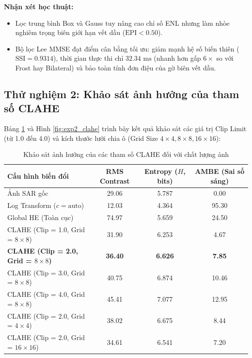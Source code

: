 \noindent \textbf{Nhận xét học thuật:}
\begin{itemize}
    \item Lọc trung bình Box và Gauss tuy nâng cao chỉ số ENL nhưng làm nhòe nghiêm trọng biên giới hạn vết dầu ($\text{EPI} < 0.50$).
    \item Bộ lọc Lee MMSE đạt điểm cân bằng tối ưu: giảm mạnh hệ số biến thiên ($\text{SSI} = 0.9314$), thời gian thực thi chỉ $32.34\text{ ms}$ (nhanh hơn gấp $6\times$ so với Frost hay Bilateral) và bảo toàn tính đơn điệu của gờ biên vết dầu.
\end{itemize}

\subsection{Thử nghiệm 2: Khảo sát ảnh hưởng của tham số CLAHE}
Bảng \ref{tab:exp2_clahe} và Hình \ref{fig:exp2_clahe} trình bày kết quả khảo sát các giá trị Clip Limit (từ 1.0 đến 4.0) và kích thước lưới chia ô (Grid Size $4 \times 4, 8 \times 8, 16 \times 16$):

\begin{table}[H]
\centering
\small
\begin{tabularx}{\textwidth}{|X|c|c|c|}
\hline
\textbf{Cấu hình biến đổi} & \textbf{RMS Contrast} & \textbf{Entropy ($H$, bits)} & \textbf{AMBE (Sai số sáng)} \\
\hline
Ảnh SAR gốc & 29.06 & 5.787 & 0.00 \\
Log Transform ($c=\text{auto}$) & 12.03 & 4.364 & 95.30 \\
Global HE (Toàn cục) & 74.97 & 5.659 & 24.50 \\
CLAHE (Clip = 1.0, Grid = $8 \times 8$) & 31.90 & 6.253 & 4.67 \\
\textbf{CLAHE (Clip = 2.0, Grid = $8 \times 8$)} & \textbf{36.40} & \textbf{6.626} & \textbf{7.85} \\
CLAHE (Clip = 3.0, Grid = $8 \times 8$) & 40.75 & 6.874 & 10.46 \\
CLAHE (Clip = 4.0, Grid = $8 \times 8$) & 45.41 & 7.077 & 12.95 \\
CLAHE (Clip = 2.0, Grid = $4 \times 4$) & 38.02 & 6.675 & 8.44 \\
CLAHE (Clip = 2.0, Grid = $16 \times 16$) & 34.61 & 6.541 & 7.20 \\
\hline
\end{tabularx}
\caption{Khảo sát ảnh hưởng của các tham số CLAHE đối với chất lượng ảnh}
\label{tab:exp2_clahe}
\end{table}

